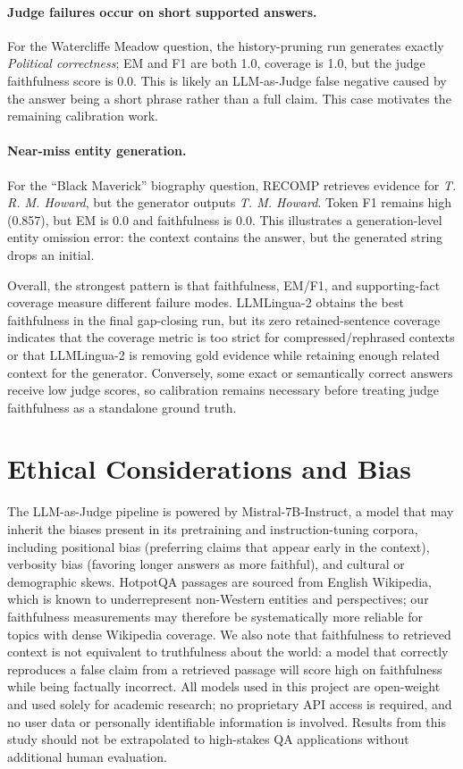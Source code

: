 \documentclass[11pt,a4paper]{article}
\begin{document}
\paragraph{Judge failures occur on short supported answers.}
For the Watercliffe Meadow question, the history-pruning run generates exactly \textit{Political correctness}; EM and F1 are both 1.0, coverage is 1.0, but the judge faithfulness score is 0.0. This is likely an LLM-as-Judge false negative caused by the answer being a short phrase rather than a full claim. This case motivates the remaining calibration work.

\paragraph{Near-miss entity generation.}
For the ``Black Maverick'' biography question, RECOMP retrieves evidence for \textit{T. R. M. Howard}, but the generator outputs \textit{T. M. Howard}. Token F1 remains high (0.857), but EM is 0.0 and faithfulness is 0.0. This illustrates a generation-level entity omission error: the context contains the answer, but the generated string drops an initial.

Overall, the strongest pattern is that faithfulness, EM/F1, and supporting-fact coverage measure different failure modes. LLMLingua-2 obtains the best faithfulness in the final gap-closing run, but its zero retained-sentence coverage indicates that the coverage metric is too strict for compressed/rephrased contexts or that LLMLingua-2 is removing gold evidence while retaining enough related context for the generator. Conversely, some exact or semantically correct answers receive low judge scores, so calibration remains necessary before treating judge faithfulness as a standalone ground truth.

\section{Ethical Considerations and Bias}

The LLM-as-Judge pipeline is powered by Mistral-7B-Instruct, a model that may inherit the biases present in its pretraining and instruction-tuning corpora, including positional bias (preferring claims that appear early in the context), verbosity bias (favoring longer answers as more faithful), and cultural or demographic skews. HotpotQA passages are sourced from English Wikipedia, which is known to underrepresent non-Western entities and perspectives; our faithfulness measurements may therefore be systematically more reliable for topics with dense Wikipedia coverage. We also note that faithfulness to retrieved context is not equivalent to truthfulness about the world: a model that correctly reproduces a false claim from a retrieved passage will score high on faithfulness while being factually incorrect. All models used in this project are open-weight and used solely for academic research; no proprietary API access is required, and no user data or personally identifiable information is involved. Results from this study should not be extrapolated to high-stakes QA applications without additional human evaluation.
\end{document}
